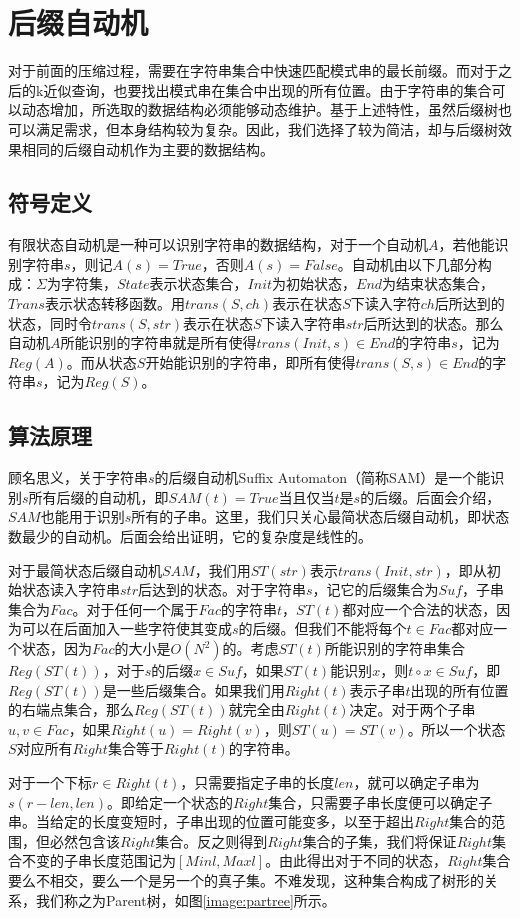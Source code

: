 ﻿\documentclass{sysuthesis}
\begin{document}
\chapter{后缀自动机}
对于前面的压缩过程，需要在字符串集合中快速匹配模式串的最长前缀。而对于之后的k近似查询，也要找出模式串在集合中出现的所有位置。由于字符串的集合可以动态增加，所选取的数据结构必须能够动态维护。基于上述特性，虽然后缀树也可以满足需求，但本身结构较为复杂。因此，我们选择了较为简洁，却与后缀树\cite{ukkonen1995line}效果相同的后缀自动机\cite{ukkonen1993approximate}作为主要的数据结构。



\section{符号定义}
有限状态自动机是一种可以识别字符串的数据结构，对于一个自动机$A$，若他能识别字符串$s$，则记$A(s) = True$，否则$A(s) = False$。自动机由以下几部分构成：$\Sigma$为字符集，$State$表示状态集合，$Init$为初始状态，$End$为结束状态集合，$Trans$表示状态转移函数。用$trans(S, ch)$表示在状态$S$下读入字符$ch$后所达到的状态，同时令$trans(S, str)$表示在状态$S$下读入字符串$str$后所达到的状态。那么自动机$A$所能识别的字符串就是所有使得$trans(Init, s) \in End$的字符串$s$，记为$Reg(A)$。而从状态$S$开始能识别的字符串，即所有使得$trans(S, s) \in End$的字符串$s$，记为$Reg(S)$。



\section{算法原理}
顾名思义，关于字符串$s$的后缀自动机Suffix Automaton（简称SAM）是一个能识别$s$所有后缀的自动机，即$SAM(t) = True$当且仅当$t$是$s$的后缀。后面会介绍，$SAM$也能用于识别$s$所有的子串。这里，我们只关心最简状态后缀自动机，即状态数最少的自动机。后面会给出证明，它的复杂度是线性的。\par
对于最简状态后缀自动机$SAM$，我们用$ST(str)$表示$trans(Init, str)$，即从初始状态读入字符串$str$后达到的状态。对于字符串$s$，记它的后缀集合为$Suf$，子串集合为$Fac$。对于任何一个属于$Fac$的字符串$t$，$ST(t)$都对应一个合法的状态，因为可以在后面加入一些字符使其变成$s$的后缀。但我们不能将每个$t \in Fac$都对应一个状态，因为$Fac$的大小是$O(N^2)$的。考虑$ST(t)$所能识别的字符串集合$Reg(ST(t))$，对于$s$的后缀$x \in Suf$，如果$ST(t)$能识别$x$，则$t \circ x \in Suf$，即$Reg(ST(t))$是一些后缀集合。如果我们用$Right(t)$表示子串$t$出现的所有位置的右端点集合，那么$Reg(ST(t))$就完全由$Right(t)$决定。对于两个子串$u, v \in Fac$，如果$Right(u) = Right(v)$，则$ST(u) = ST(v)$。所以一个状态$S$对应所有$Right$集合等于$Right(t)$的字符串。\par
对于一个下标$r \in Right(t)$，只需要指定子串的长度$len$，就可以确定子串为$s(r - len, len)$。即给定一个状态的$Right$集合，只需要子串长度便可以确定子串。当给定的长度变短时，子串出现的位置可能变多，以至于超出$Right$集合的范围，但必然包含该$Right$集合。反之则得到$Right$集合的子集，我们将保证$Right$集合不变的子串长度范围记为$[Minl, Maxl]$。由此得出对于不同的状态，$Right$集合要么不相交，要么一个是另一个的真子集。不难发现，这种集合构成了树形的关系，我们称之为Parent树，如图\ref{image:partree}所示。\par
\end{document}
